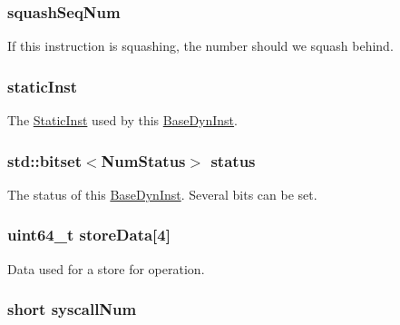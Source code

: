 \label{classInOrderDynInst_af84b7d3bf213abe92efa728d6e2ff135}
\hypertarget{classInOrderDynInst_a34292b1418c46ca63c892e7826510d77}{
\subsubsection[{squashSeqNum}]{ {\bf squashSeqNum}}}
\label{classInOrderDynInst_a34292b1418c46ca63c892e7826510d77}
If this instruction is squashing, the number should we squash behind. \hypertarget{classInOrderDynInst_a6799d48af805bf0bd72441e882589a6a}{
\subsubsection[{staticInst}]{ {\bf staticInst}}}
\label{classInOrderDynInst_a6799d48af805bf0bd72441e882589a6a}
The \hyperlink{classStaticInst}{StaticInst} used by this \hyperlink{classBaseDynInst}{BaseDynInst}. \hypertarget{classInOrderDynInst_aa3a3e4b13899ec096589e2e0c76f25bc}{
\subsubsection[{status}]{\setlength{\rightskip}{0pt plus 5cm}std::bitset$<$NumStatus$>$ {\bf status}}}
\label{classInOrderDynInst_aa3a3e4b13899ec096589e2e0c76f25bc}
The status of this \hyperlink{classBaseDynInst}{BaseDynInst}. Several bits can be set. \hypertarget{classInOrderDynInst_aa8b3ce2cb083b44a6a713b4e35f566ef}{
\subsubsection[{storeData}]{\setlength{\rightskip}{0pt plus 5cm}uint64\_\-t {\bf storeData}\mbox{[}4\mbox{]}}}
\label{classInOrderDynInst_aa8b3ce2cb083b44a6a713b4e35f566ef}
Data used for a store for operation. \hypertarget{classInOrderDynInst_a7d7da113347fdefcd5ad59f29769df0b}{
\subsubsection[{syscallNum}]{\setlength{\rightskip}{0pt plus 5cm}short {\bf syscallNum}}}
